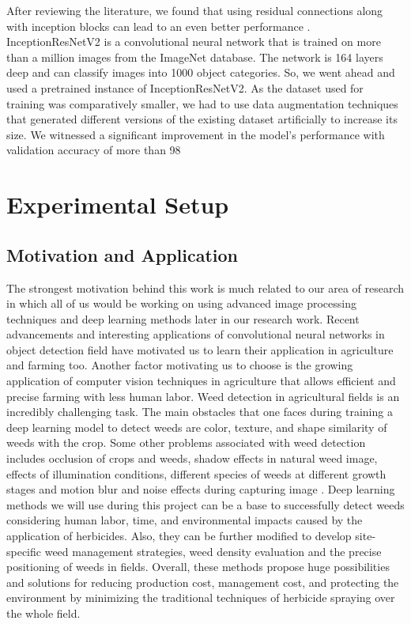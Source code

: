 \documentclass{report}
\begin{document}
After reviewing the literature, we found that using residual connections along with inception blocks can lead to an even better performance . InceptionResNetV2 is a convolutional neural network that is trained on more than a million images from the ImageNet database. The network is 164 layers deep and can classify images into 1000 object categories. So, we went ahead and used a pretrained instance of InceptionResNetV2. As the dataset used for training was comparatively smaller, we had to use data augmentation techniques that generated different versions of the existing dataset artificially to increase its size. We witnessed a significant improvement in the model’s performance with validation accuracy of more than 98%




\section{Experimental Setup}
\label{sec:M3-setup}
\subsection{Motivation and Application}
The strongest motivation behind this work is much related to our area of research in which all of us would be working on using advanced image processing techniques and deep learning methods later in our research work. Recent advancements and interesting applications of convolutional neural networks in object detection field have motivated us to learn their application in agriculture and farming too. Another factor motivating us to choose is the growing application of computer vision techniques in agriculture that allows efficient and precise farming with less human labor. Weed detection in agricultural fields is an incredibly challenging task. The main obstacles that one faces during training a deep learning model to detect weeds are color, texture, and shape similarity of weeds with the crop. Some other problems associated with weed detection includes occlusion of crops and weeds, shadow effects in natural weed image, effects of illumination conditions, different species of weeds at different growth stages and motion blur and noise effects during capturing image \cite{hasan2021survey}. Deep learning methods we will use during this project can be a base to successfully detect weeds considering human labor, time, and environmental impacts caused by the application of herbicides. Also, they can be further modified to develop site-specific weed management strategies, weed density evaluation and the precise positioning of weeds in fields. Overall, these methods propose huge possibilities and solutions for reducing production cost, management cost, and protecting the environment by minimizing the traditional techniques of herbicide spraying over the whole field. 
\end{document}
